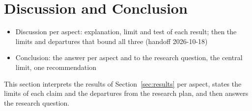 \section{Discussion and Conclusion}\label{sec:conclusion}
\ifdraft
\begin{itemize}
\item Discussion per aspect: explanation, limit and test of each result; then the limits and departures that bound all three (handoff 2026-10-18)
\item Conclusion: the answer per aspect and to the research question, the central limit, one recommendation
\end{itemize}
\fi
This section interprets the results of Section~\ref{sec:results} per aspect,
states the limits of each claim and the departures from the research plan,
and then answers the research question.

